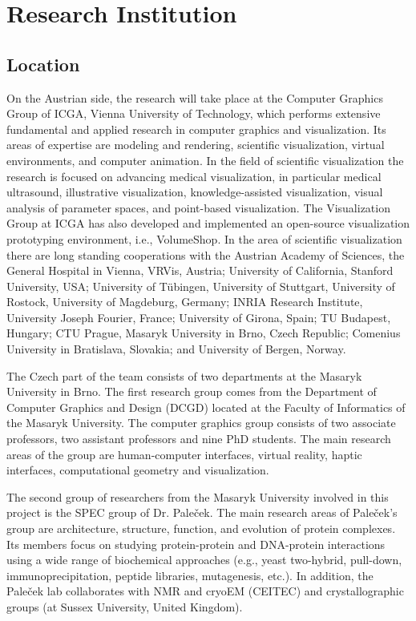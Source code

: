 \documentclass[11pt,a4paper,titlepage,oneside,onecolumn]{article}
\begin{document}
\section{Research Institution}
\label{sec:ResearchInstitution}

\subsection{Location}
On the Austrian side, the research will take place at the Computer Graphics Group of ICGA, Vienna University of Technology, which performs extensive fundamental and applied research in computer graphics and visualization. 
Its areas of expertise are modeling and rendering, scientific visualization, virtual environments, and computer animation. In the field of scientific visualization the research is focused on advancing medical visualization, in particular medical ultrasound, illustrative visualization, knowledge-assisted visualization, visual analysis of parameter spaces, and point-based visualization. The Visualization Group at ICGA has also developed and implemented an open-source visualization prototyping environment, i.e., VolumeShop. In the area of scientific visualization there are long standing cooperations with the Austrian Academy of Sciences, the General Hospital in Vienna, VRVis, Austria; University of California, Stanford University, USA; University of T\"{u}bingen, University of Stuttgart, University of Rostock, University of Magdeburg, Germany; INRIA Research Institute, University Joseph Fourier, France;  University of Girona, Spain; TU Budapest, Hungary; CTU Prague, Masaryk University in Brno, Czech Republic; Comenius University in Bratislava, Slovakia; and University of Bergen, Norway.

The Czech part of the team consists of two departments at the Masaryk University in Brno.
The first research group comes from the Department of Computer Graphics and Design (DCGD) located at the Faculty of Informatics of the Masaryk University. 
The computer graphics group consists of two associate professors, two assistant professors and nine PhD students. 
The main research areas of the group are human-computer interfaces, virtual reality, haptic interfaces, computational geometry and visualization. 

The second group of researchers from the Masaryk University involved in this project is the SPEC group of Dr. Pale\v{c}ek. 
The main research areas of Pale\v{c}ek's group are architecture, structure, function, and evolution of protein complexes.
Its members focus on studying protein-protein and DNA-protein interactions using a wide range of biochemical approaches (e.g., yeast two-hybrid, pull-down, immunoprecipitation, peptide libraries, mutagenesis, etc.). 
In addition, the Pale\v{c}ek lab collaborates with NMR and cryoEM (CEITEC) and crystallographic groups (at Sussex University, United Kingdom). 
\end{document}
